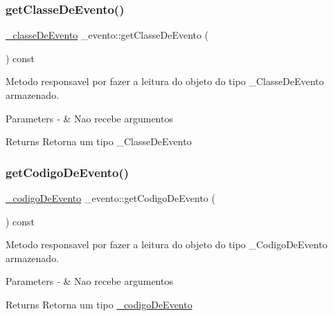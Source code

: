 \subsubsection{\texorpdfstring{getClasseDeEvento()}{getClasseDeEvento()}}
{\footnotesize\ttfamily \mbox{\hyperlink{class__classe_de_evento}{\+\_\+classe\+De\+Evento}} \+\_\+evento\+::get\+Classe\+De\+Evento (\begin{DoxyParamCaption}{ }\end{DoxyParamCaption}) const}



Metodo responsavel por fazer a leitura do objeto do tipo \+\_\+\+Classe\+De\+Evento armazenado. 


\begin{DoxyParams}{Parameters}
{\em -\/} & Nao recebe argumentos \\
\hline
\end{DoxyParams}
\begin{DoxyReturn}{Returns}
Retorna um tipo \+\_\+\+Classe\+De\+Evento 
\end{DoxyReturn}
\mbox{\label{class__evento_af23e6eb402415c8b4661c0508c6de175}} 
\subsubsection{\texorpdfstring{getCodigoDeEvento()}{getCodigoDeEvento()}}
{\footnotesize\ttfamily \mbox{\hyperlink{class__codigo_de_evento}{\+\_\+codigo\+De\+Evento}} \+\_\+evento\+::get\+Codigo\+De\+Evento (\begin{DoxyParamCaption}{ }\end{DoxyParamCaption}) const}



Metodo responsavel por fazer a leitura do objeto do tipo \+\_\+\+Codigo\+De\+Evento armazenado. 


\begin{DoxyParams}{Parameters}
{\em -\/} & Nao recebe argumentos \\
\hline
\end{DoxyParams}
\begin{DoxyReturn}{Returns}
Retorna um tipo \mbox{\hyperlink{class__codigo_de_evento}{\+\_\+codigo\+De\+Evento}} 
\end{DoxyReturn}
\mbox{\label{class__evento_a786626712151d8e0aae854b73c6d195c}} 
